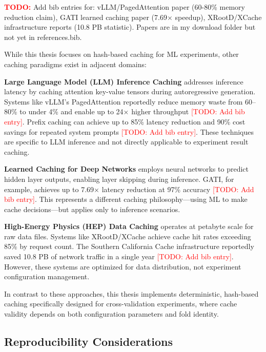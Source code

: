 \documentclass{imc-inf} %
\begin{document}
\begin{center}
\colorbox{red!20}{%
\begin{minipage}{0.9\textwidth}
\textcolor{red}{\textbf{TODO:}} Add bib entries for: vLLM/PagedAttention paper 
(60-80\% memory reduction claim), GATI learned caching paper (7.69$\times$ speedup), 
XRootD/XCache infrastructure reports (10.8 PB statistic). Papers are in my 
download folder but not yet in references.bib.
\end{minipage}
}
\end{center}

While this thesis focuses on hash-based caching for ML experiments, other 
caching paradigms exist in adjacent domains:

\textbf{Large Language Model (LLM) Inference Caching} addresses inference 
latency by caching attention key-value tensors during autoregressive generation. 
Systems like vLLM's PagedAttention reportedly reduce memory waste from 60--80\% 
to under 4\% and enable up to 24$\times$ higher throughput \textcolor{red}{[TODO: Add bib entry]}. 
Prefix caching can achieve up to 85\% latency reduction and 90\% cost savings 
for repeated system prompts \textcolor{red}{[TODO: Add bib entry]}. These techniques 
are specific to LLM inference and not directly applicable to experiment result caching.

\textbf{Learned Caching for Deep Networks} employs neural networks to predict 
hidden layer outputs, enabling layer skipping during inference. GATI, for 
example, achieves up to 7.69$\times$ latency reduction at 97\% accuracy 
\textcolor{red}{[TODO: Add bib entry]}. This represents a different caching 
philosophy—using ML to make cache decisions—but applies only to inference scenarios.

\textbf{High-Energy Physics (HEP) Data Caching} operates at petabyte scale 
for raw data files. Systems like XRootD/XCache achieve cache hit rates exceeding 
85\% by request count. The Southern California Cache infrastructure reportedly 
saved 10.8 PB of network traffic in a single year \textcolor{red}{[TODO: Add bib entry]}. 
However, these systems are optimized for data distribution, not experiment 
configuration management.

In contrast to these approaches, this thesis implements deterministic, 
hash-based caching specifically designed for cross-validation experiments, 
where cache validity depends on both configuration parameters and fold identity.

\subsection{Reproducibility Considerations}
\end{document}
